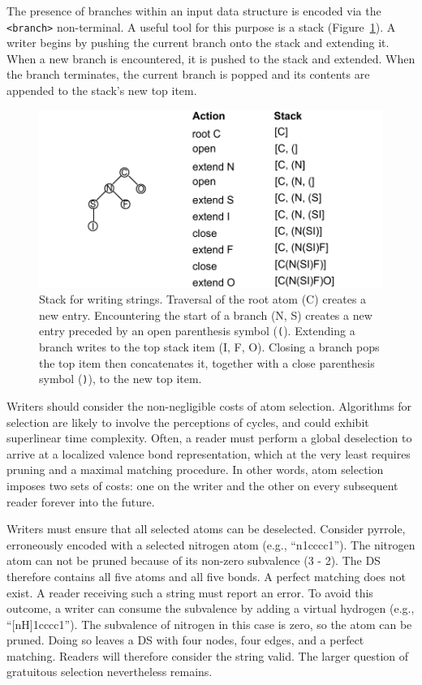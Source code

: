 \documentclass{article}
\def\ttt{\texttt}
\begin{document}
The presence of branches within an input data structure is encoded via the \ttt{<branch>} non-terminal. A useful tool for this purpose is a stack (Figure~\ref{fig:stack-for-writer}). A writer begins by pushing the current branch onto the stack and extending it. When a new branch is encountered, it is pushed to the stack and extended. When the branch terminates, the current branch is popped and its contents are appended to the stack's new top item.

\begin{figure}
    \centering
    \includegraphics[width=\columnwidth]{stack-for-writer.pdf}
    \caption{Stack for writing strings. Traversal of the root atom (C) creates a new entry. Encountering the start of a branch (N, S) creates a new entry preceded by an open parenthesis symbol (\ttt{(}). Extending a branch writes to the top stack item (I, F, O). Closing a branch pops the top item then concatenates it, together with a close parenthesis symbol (\ttt{)}), to the new top item.}
    \label{fig:stack-for-writer}
\end{figure}

Writers should consider the non-negligible costs of atom selection. Algorithms for selection are likely to involve the perceptions of cycles, and could exhibit superlinear time complexity. Often, a reader must perform a global deselection to arrive at a localized valence bond representation, which at the very least requires pruning and a maximal matching procedure. In other words, atom selection imposes two sets of costs: one on the writer and the other on every subsequent reader forever into the future.

Writers must ensure that all selected atoms can be deselected. Consider pyrrole, erroneously encoded with a selected nitrogen atom (e.g., \enquote{n1cccc1}). The nitrogen atom can not be pruned because of its non-zero subvalence (3 - 2). The DS therefore contains all five atoms and all five bonds. A perfect matching does not exist. A reader receiving such a string must report an error. To avoid this outcome, a writer can consume the subvalence by adding a virtual hydrogen (e.g., \enquote{[nH]1cccc1}). The subvalence of nitrogen in this case is zero, so the atom can be pruned. Doing so leaves a DS with four nodes, four edges, and a perfect matching. Readers will therefore consider the string valid. The larger question of gratuitous selection nevertheless remains.
\end{document}
